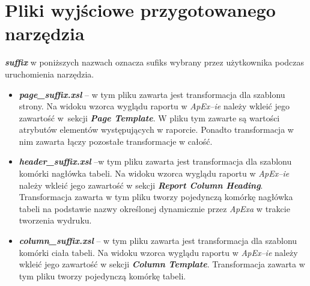 \documentclass[11pt,a4paper]{article}
\begin{document}
\section{Pliki wyjściowe przygotowanego narzędzia} \label{app:output}
\emph{\textbf{suffix}} w poniższych nazwach oznacza sufiks wybrany przez użytkownika podczas uruchomienia narzędzia.
\begin{itemize}
	\item \emph{\textbf{page\_suffix.xsl}} -- w tym pliku zawarta jest transformacja dla szablonu strony. Na widoku wzorca wyglądu raportu w \emph{ApEx--ie} należy wkleić jego zawartość w~sekcji \emph{\textbf{Page Template}}. W pliku tym zawarte są wartości atrybutów elementów występujących w raporcie. Ponadto transformacja w nim zawarta łączy pozostałe transformacje w całość.
	\item \emph{\textbf{header\_suffix.xsl}} --w tym pliku zawarta jest transformacja dla szablonu komórki nagłówka tabeli. Na widoku wzorca wyglądu raportu w \emph{ApEx--ie} należy wkleić jego zawartość w sekcji \emph{\textbf{Report Column Heading}}. Transformacja zawarta w tym pliku tworzy pojedynczą komórkę nagłówka tabeli na podstawie nazwy określonej dynamicznie przez \emph{ApExa} w trakcie tworzenia wydruku. 
	\item \emph{\textbf{column\_suffix.xsl}} -- w tym pliku zawarta jest transformacja dla szablonu komórki ciała tabeli. Na widoku wzorca wyglądu raportu w \emph{ApEx--ie} należy wkleić jego zawartość w sekcji \emph{\textbf{Column Template}}. Transformacja zawarta w tym pliku tworzy pojedynczą komórkę tabeli.
\end{itemize}
\end{document}
